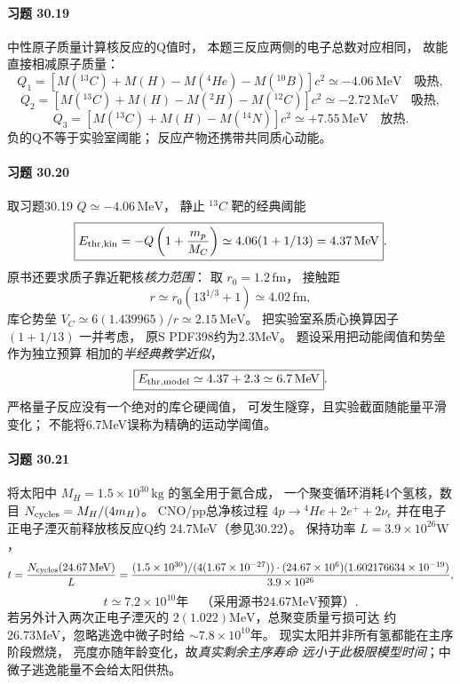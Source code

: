 \paragraph{习题 30.19}
中性原子质量计算核反应的Q值时，
本题三反应两侧的电子总数对应相同，
故能直接相减原子质量：
\[
Q_1=[M({}^{13}C)+M(H)-M({}^{4}He)-M({}^{10}B)]c^2
\simeq\boxed{-4.06\,\mathrm{MeV}}\quad\text{吸热},
\]
\[
Q_2=[M({}^{13}C)+M(H)-M({}^{2}H)-M({}^{12}C)]c^2
\simeq\boxed{-2.72\,\mathrm{MeV}}\quad\text{吸热},
\]
\[
Q_3=[M({}^{13}C)+M(H)-M({}^{14}N)]c^2
\simeq\boxed{+7.55\,\mathrm{MeV}}\quad\text{放热}.
\]
负的Q不等于实验室阈能；
反应产物还携带共同质心动能。

\paragraph{习题 30.20}
取习题30.19 \(Q\simeq-4.06\,\mathrm{MeV}\)，
静止 \({}^{13}C\) 靶的经典阈能
\[
\boxed{E_{\rm thr,kin}
=-Q\left(1+\frac{m_p}{M_C}\right)
\simeq4.06(1+1/13)=4.37\,\mathrm{MeV}}.
\]
原书还要求质子靠近靶核\emph{核力范围}：
取 \(r_0=1.2\,\mathrm{fm}\)，
接触距
\[
r\simeq r_0(13^{1/3}+1)\simeq4.02\,\mathrm{fm},
\]
库仑势垒
\(V_C\simeq6(1.439965)/r\simeq2.15\,\mathrm{MeV}\)。
把实验室系质心换算因子
\((1+1/13)\) 一并考虑，
原S PDF398约为2.3MeV。
题设采用把动能阈值和势垒作为独立预算
相加的\emph{半经典教学近似}，
\[
\boxed{E_{\rm thr,model}\simeq4.37+2.3
\simeq6.7\,\mathrm{MeV}}.
\]
严格量子反应没有一个绝对的库仑硬阈值，
可发生隧穿，且实验截面随能量平滑变化；
不能将6.7MeV误称为精确的运动学阈值。

\paragraph{习题 30.21}
将太阳中 \(M_H=1.5\times10^{30}\,\mathrm{kg}\)
的氢全用于氦合成，
一个聚变循环消耗4个氢核，数目
\(N_{\rm cycles}=M_H/(4m_H)\)。
CNO/pp总净核过程
\(4p\to{}^{4}He+2e^++2\nu_e\)
并在电子正电子湮灭前释放核反应Q约
24.7MeV（参见30.22）。
保持功率 \(L=3.9\times10^{26}\mathrm W\)，
\[
t=\frac{N_{\rm cycles}(24.67\,\mathrm{MeV})}{L}
=\frac{(1.5\times10^{30})/(4(1.67\times10^{-27}))
\cdot(24.67\times10^6)(1.602176634\times10^{-19})}
{3.9\times10^{26}},
\]
\[
\boxed{t\simeq7.2\times10^{10}\text{年}}
\quad\text{（采用源书24.67MeV预算）}.
\]
若另外计入两次正电子湮灭的
\(2(1.022)\mathrm{MeV}\)，总聚变质量亏损可达
约26.73MeV，忽略逃逸中微子时给
\(\sim7.8\times10^{10}\)年。
现实太阳并非所有氢都能在主序阶段燃烧，
亮度亦随年龄变化，故\emph{真实剩余主序寿命
远小于此极限模型时间}；中微子逃逸能量不会给太阳供热。

